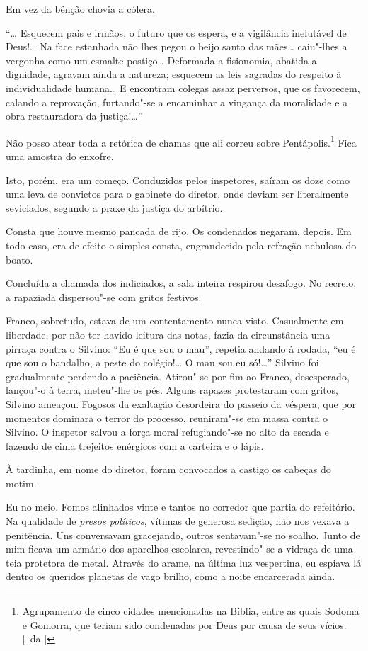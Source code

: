 Em vez da bênção chovia a cólera. 

``\ldots{} Esquecem pais e irmãos, o futuro que os espera, e a
vigilância inelutável de Deus!\ldots{} Na face estanhada não lhes pegou o
beijo santo das mães\ldots{} caiu"-lhes a vergonha como um esmalte
postiço\ldots{} Deformada a fisionomia, abatida a dignidade, agravam ainda a
natureza; esquecem as leis sagradas do respeito à individualidade
humana\ldots{} E encontram colegas assaz perversos, que os favorecem,
calando a reprovação, furtando"-se a encaminhar a vingança da
moralidade e a obra restauradora da justiça!\ldots{}'' 

Não posso atear toda a retórica de chamas que ali correu 
sobre Pentápolis.\footnote{ Agrupamento de cinco cidades mencionadas na Bíblia, 
entre as quais Sodoma e Gomorra, que teriam sido condenadas por Deus 
por causa de seus vícios. [~da ]} Fica uma amostra do enxofre. 

Isto, porém, era um começo. Conduzidos pelos inspetores,
saíram os doze como uma leva de convictos para o gabinete do diretor,
onde deviam ser literalmente seviciados, segundo a praxe da justiça do
arbítrio. 

Consta que houve mesmo pancada de rijo. Os condenados
negaram, depois. Em todo caso, era de efeito o simples consta,
engrandecido pela refração nebulosa do boato. 

Concluída a chamada dos indiciados, a sala inteira respirou 
desafogo. No recreio, a rapaziada dispersou"-se com gritos festivos.

Franco, sobretudo, estava de um contentamento nunca visto. Casualmente
em liberdade, por não ter havido leitura das notas, fazia da
circunstância uma pirraça contra o Silvino: ``Eu é que sou o mau'',
repetia andando à rodada, ``eu é que sou o bandalho, a peste do
colégio!\ldots{} O mau sou eu só!\ldots{}'' Silvino foi gradualmente perdendo a
paciência. Atirou"-se por fim ao Franco, desesperado, lançou"-o à
terra, meteu"-lhe os pés. Alguns rapazes protestaram com gritos,
Silvino ameaçou. Fogosos da exaltação desordeira do passeio da véspera,
que por momentos dominara o terror do processo, reuniram"-se em massa
contra o Silvino. O inspetor salvou a força moral refugiando"-se no
alto da escada e fazendo de cima trejeitos enérgicos com a carteira e o
lápis. 

À tardinha, em nome do diretor, foram convocados a castigo os
cabeças do motim. 

Eu no meio. Fomos alinhados vinte e tantos no
corredor que partia do refeitório. Na qualidade de \textit{presos políticos},
vítimas de generosa sedição, não nos vexava a penitência. Uns
conversavam gracejando, outros sentavam"-se no soalho. Junto de mim
ficava um armário dos aparelhos escolares, revestindo"-se a vidraça de
uma teia protetora de metal. Através do arame, na última luz
vespertina, eu espiava lá dentro os queridos planetas de vago brilho,
como a noite encarcerada ainda. 

